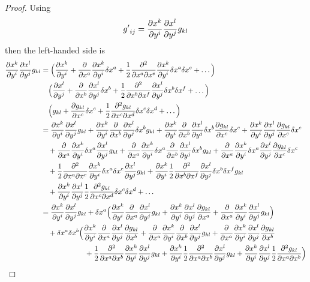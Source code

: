 \begin{proof}
        Using  
        \begin{equation*}
            {g'}_{ij} = \pdv{x^k}{y^i} \pdv{x^l}{y^j} g_{kl}
        \end{equation*}
        then the left-handed side is
        \begin{equation*}
        \begin{aligned}
            \pdv{x^k}{y^i} \pdv{x^l}{y^j} g_{kl} & = 
            \Big ( \pdv{x^k}{y^i} + \pdv{}{x^a} \pdv{x^k}{y^i} \delta x^a + \frac{1}{2} \pdvd{}{x^a}{x^e} \pdv{x^k}{y^i} \delta x^a \delta x^e + \ldots \Big ) \\ & \quad
            \Big ( \pdv{x^l}{y^j} + \pdv{}{x^b} \pdv{x^l}{y^j} \delta x^b + \frac{1}{2} \pdvd{}{x^b}{x^f} \pdv{x^l}{y^j} \delta x^b \delta x^f  + \ldots \Big ) \\ & \quad
            \Big ( g_{kl} + \pdv{g_{kl}}{x^c}  \delta x^c + \frac{1}{2} \pdvd{g_{kl}}{x^c}{x^d} \delta x^c \delta x^d + \ldots \Big ) 
            \\ & = 
            \pdv{x^k}{y^i} \pdv{x^l}{y^j} g_{kl} 
            + \pdv{x^k}{y^i} \pdv{}{x^b} \pdv{x^l}{y^j} \delta x^b g_{kl} 
            + \pdv{x^k}{y^i} \pdv{}{x^b} \pdv{x^l}{y^j} \delta x^b \pdv{g_{kl}}{x^c} \delta x^c 
            + \pdv{x^k}{y^i} \pdv{x^l}{y^j} \pdv{g_{kl}}{x^c}  \delta x^c \\ & \quad 
            + \pdv{}{x^a} \pdv{x^k}{y^i} \delta x^a  \pdv{x^l}{y^j} g_{kl} 
            + \pdv{}{x^a} \pdv{x^k}{y^i} \delta x^a \pdv{}{x^b} \pdv{x^l}{y^j} \delta x^b g_{kl}
            + \pdv{}{x^a} \pdv{x^k}{y^i} \delta x^a  \pdv{x^l}{y^j} \pdv{g_{kl}}{x^c} \delta x^c \\ & \quad 
            + \frac{1}{2} \pdvd{}{x^a}{x^e} \pdv{x^k}{y^i} \delta x^a \delta x^e \pdv{x^l}{y^j} g_{kl} 
            + \pdv{x^k}{y^i} \frac{1}{2} \pdvd{}{x^b}{x^f} \pdv{x^l}{y^j} \delta x^b \delta x^f g_{kl} \\ & \quad 
            + \pdv{x^k}{y^i} \pdv{x^l}{y^j} \frac{1}{2} \pdvd{g_{kl}}{x^c}{x^d} \delta x^c \delta x^d + \ldots 
            \\ & = \pdv{x^k}{y^i} \pdv{x^l}{y^j} g_{kl} + \delta x^a \Big( \pdv{x^k}{y^i} \pdv{}{x^a} \pdv{x^l}{y^j} g_{kl} + \pdv{x^k}{y^i} \pdv{x^l}{y^j} \pdv{g_{kl}}{x^a} + \pdv{}{x^a} \pdv{x^k}{y^i} \pdv{x^l}{y^j} g_{kl} \Big) 
            \\ & \quad + \delta x^a \delta x^b \Big(
            \pdv{x^k}{y^i} \pdv{}{x^a} \pdv{x^l}{y^j} \pdv{g_{kl}}{x^b}
            + \pdv{}{x^a} \pdv{x^k}{y^i}\pdv{}{x^b} \pdv{x^l}{y^j} g_{kl}
            + \pdv{}{x^a} \pdv{x^k}{y^i} \pdv{x^l}{y^j} \pdv{g_{kl}}{x^b}
            \\ & \qquad \qquad \qquad + \frac{1}{2} \pdvd{}{x^a}{x^b} \pdv{x^k}{y^i} \pdv{x^l}{y^j} g_{kl} 
            + \pdv{x^k}{y^i} \frac{1}{2} \pdvd{}{x^a}{x^b} \pdv{x^l}{y^j} g_{kl}
            + \pdv{x^k}{y^i} \pdv{x^l}{y^j} \frac{1}{2} \pdvd{g_{kl}}{x^a}{x^b} \Big)
        \end{aligned}
        \end{equation*}


\end{proof}
